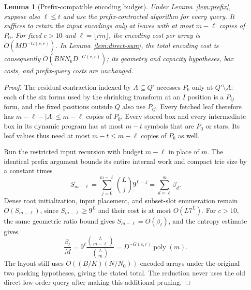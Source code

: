 \documentclass[11pt]{article}
\newtheorem{lemma}[theorem]{Lemma}
\begin{document}
\begin{lemma}[Prefix-compatible encoding budget]
\label{lem:prefix-encoding-budget}
Under Lemma~\ref{lem:prefix}, suppose also $\ell\le t$ and use the
prefix-contracted algorithm for every query. It suffices to retain the
input encodings only at leaves with at most $m-\ell$ copies of $P_0$.
For fixed $c>10$ and $\ell=\lfloor rm\rfloor$, the encoding cost per
array is $\widetilde O(MD^{-G(c,r)})$. In Lemma~\ref{lem:direct-sum},
the total encoding cost is consequently
$\widetilde O(BNN_0D^{-G(c,r)})$; its geometry and capacity hypotheses,
box costs, and prefix-query costs are unchanged.
\end{lemma}
\begin{proof}
The residual contraction indexed by $A\subseteq Q'$ accesses $P_0$
only at $Q'\setminus A$: each of the six forms used by the shrinking
transform at an $I$ position is a $P_{ij}$ form, and the fixed positions
outside $Q$ also use $P_{ij}$. Every fetched leaf therefore has
$m-\ell-|A|\le m-\ell$ copies of $P_0$. Every stored box and every
intermediate box in its dynamic program has at most $m-t$ symbols that
are $P_0$ or stars. Its leaf values thus need at most $m-t\le m-\ell$
copies of $P_0$ as well.

Run the restricted input recursion with budget $m-\ell$ in place of $m$.
The identical prefix argument bounds its entire internal work and compact
trie size by a constant times
\[
S_{m-\ell}=\sum_{j=0}^{m-\ell}\binom Lj9^{L-j}
           =\sum_{d=\ell}^m\beta_d.
\]
Dense root initialization, input placement, and subset-slot enumeration
remain $O(S_{m-\ell})$, since $S_{m-\ell}\ge9^L$ and their cost is at
most $O(L7^L)$. For $c>10$, the same geometric ratio bound gives
$S_{m-\ell}=O(\beta_\ell)$, and the entropy estimate gives
\[
\frac{\beta_\ell}{M}
=9^\ell\frac{\binom L{m-\ell}}{\binom Lm}
=D^{-G(c,r)}\operatorname{poly}(m).
\]
The layout still uses $O((B/K)(N/N_0))$ encoded arrays under the original
two packing hypotheses, giving the stated total. The reduction never
uses the old direct low-order query after making this additional pruning.
\end{proof}
\end{document}
